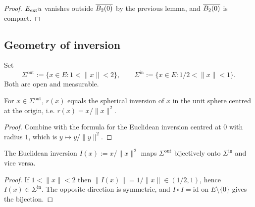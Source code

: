 \begin{proof}
\leanok
{}

$E_{\mathrm{ext}} u$ vanishes outside $\overline{B_{2}(0)}$ by the previous lemma,
and $\overline{B_{2}(0)}$ is compact.
\end{proof}

\subsection*{Geometry of inversion}

\begin{definition}
\label{def:unitBallOuterShell}
\leanok
Set
\begin{equation*}
\Sigma^{\mathrm{out}} := \{x \in E : 1 < \|x\| < 2\},
\qquad
\Sigma^{\mathrm{in}} := \{x \in E : 1/2 < \|x\| < 1\}.
\end{equation*}
Both are open and measurable.
\end{definition}

\begin{lemma}
\label{lem:unitBallRetraction_eq_inversion_of_mem_outerShell}
\leanok
{}
For $x \in \Sigma^{\mathrm{out}}$, $r(x)$ equals the spherical inversion of
$x$ in the unit sphere centred at the origin, i.e. $r(x) = x/\|x\|^2$.
\end{lemma}

\begin{proof}
\leanok
{}

Combine  with the formula
for the Euclidean inversion centred at $0$ with radius $1$, which is
$y \mapsto y/\|y\|^2$.
\end{proof}

\begin{lemma}
\label{lem:inversion_mem_unitBallInnerShell_of_mem_outerShell}
\leanok
{}
The Euclidean inversion $I(x) := x/\|x\|^2$ maps
$\Sigma^{\mathrm{out}}$ bijectively onto $\Sigma^{\mathrm{in}}$ and vice
versa.
\end{lemma}

\begin{proof}
\leanok

If $1 < \|x\| < 2$ then $\|I(x)\| = 1/\|x\| \in (1/2, 1)$, hence
$I(x) \in \Sigma^{\mathrm{in}}$. The opposite direction is symmetric, and
$I \circ I = \mathrm{id}$ on $E\setminus\{0\}$ gives the bijection.
\end{proof}

